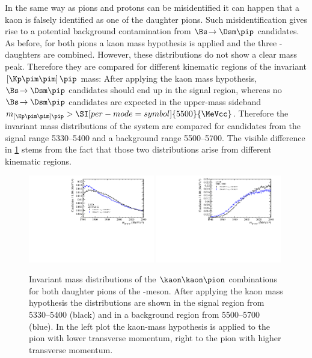 In the same way as pions and protons can be misidentified it can happen that a kaon is falsely identified as one of the \Dm daughter pions.
Such misidentification gives rise to a potential background contamination from $\Bs\!\to\Dsm\pip$ candidates.
As before, for both pions a kaon mass hypothesis is applied and the three \Dm-daughters are combined.
However,  these distributions do not show a clear mass peak.
Therefore they are compared for different kinematic regions of the invariant $\left[\Kp\pim\pim\right]\pip$ mass: After applying the kaon mass hypothesis, $\Bs\!\to\Dsm\pip$ candidates should end up in the \Bs signal region, whereas no $\Bs\!\to\Dsm\pip$ candidates are expected in the upper-mass sideband $m_{\left[\Kp\pim\pim\right]\pip}>\SI[per-mode=symbol]{5500}{\MeVcc}$.
Therefore the invariant mass distributions of the \kaon\kaon\pion system are compared for candidates from the \Bs signal range \SIrange[per-mode=symbol]{5330}{5400}{\MeVcc} and a background range \SIrange[per-mode=symbol]{5500}{5700}{\MeVcc}.
The visible difference in \cref{fig:DsVeto} stems from the fact that those two distributions arise from different kinematic regions.
\begin{figure}[tbp]
    \centering
    \includegraphics[width=0.49\textwidth]{06selection/figs/DsHypo1.pdf}
    \includegraphics[width=0.49\textwidth]{06selection/figs/DsHypo2.pdf}
    \caption{Invariant mass distributions of the $\kaon\kaon\pion$ combinations for both daughter pions of the \Dm-meson.
    After applying the kaon mass hypothesis the distributions are shown in the \Bs signal region from \SIrange[per-mode=symbol]{5330}{5400}{\MeVcc} (black) and in a background region from \SIrange[per-mode=symbol]{5500}{5700}{\MeVcc} (blue).
    In the left plot the kaon-mass hypothesis is applied to the pion with lower transverse momentum, right to the pion with higher transverse momentum.}
    \label{fig:DsVeto}
\end{figure}
